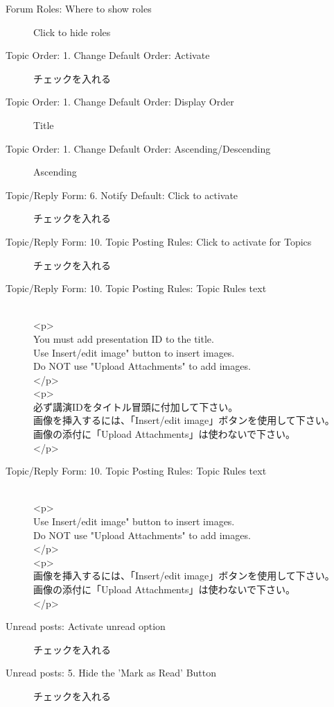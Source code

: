 \documentclass[titlepage,10pt,a4paper,uplatex]{jsbook}
\begin{document}
\begin{description}
\item[Forum Roles: Where to show roles] Click to hide roles
\item[Topic Order: 1. Change Default Order: Activate] チェックを入れる
\item[Topic Order: 1. Change Default Order: Display Order] Title
\item[Topic Order: 1. Change Default Order: Ascending/Descending] Ascending
\item[Topic/Reply Form: 6. Notify Default: Click to activate] チェックを入れる
\item[Topic/Reply Form: 10. Topic Posting Rules: Click to activate for Topics] チェックを入れる
\item[Topic/Reply Form: 10. Topic Posting Rules: Topic Rules text] \mbox{}\vspace{-2pt}\\{\textless}p{\textgreater}\\You must add presentation ID to the title.\\Use Insert/edit image" button to insert images.\\Do NOT use "Upload Attachments" to add images.\\{\textless}/p{\textgreater}\\{\textless}p{\textgreater}\\必ず講演IDをタイトル冒頭に付加して下さい。\\画像を挿入するには、「Insert/edit image」ボタンを使用して下さい。\\画像の添付に「Upload Attachments」は使わないで下さい。\\{\textless}/p{\textgreater}
\item[Topic/Reply Form: 10. Topic Posting Rules: Topic Rules text] \mbox{}\vspace{-2pt}\\{\textless}p{\textgreater}\\Use Insert/edit image" button to insert images.\\Do NOT use "Upload Attachments" to add images.\\{\textless}/p{\textgreater}\\{\textless}p{\textgreater}\\画像を挿入するには、「Insert/edit image」ボタンを使用して下さい。\\画像の添付に「Upload Attachments」は使わないで下さい。\\{\textless}/p{\textgreater}
\item[Unread posts: Activate unread option] チェックを入れる
\item[Unread posts: 5. Hide the 'Mark as Read' Button] チェックを入れる
\end{description}
\end{document}
